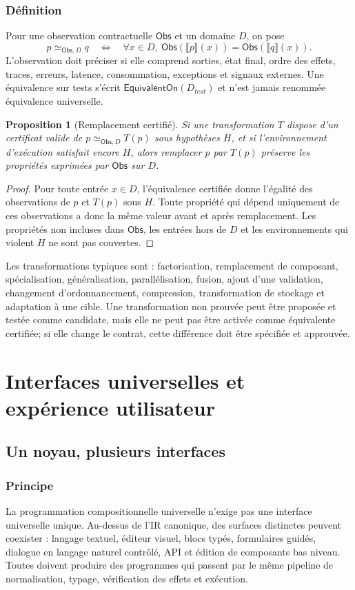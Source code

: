 \documentclass[11pt,a4paper,openany]{book}
\newcommand{\Obs}{\mathsf{Obs}}
\theoremstyle{definition}
\theoremstyle{plain}
\newtheorem{proposition}[definition]{Proposition}
\theoremstyle{remark}
\begin{document}
\section{Définition}
Pour une observation contractuelle $\Obs$ et un domaine $D$, on pose
\[
p\simeq_{\Obs,D}q\quad\Longleftrightarrow\quad \forall x\in D,\ \Obs(\llbracket p\rrbracket(x))=\Obs(\llbracket q\rrbracket(x)).
\]
L'observation doit préciser si elle comprend sorties, état final, ordre des effets, traces, erreurs, latence, consommation, exceptions et signaux externes. Une équivalence sur tests s'écrit $\mathsf{EquivalentOn}(D_{test})$ et n'est jamais renommée équivalence universelle.

\begin{proposition}[Remplacement certifié]
Si une transformation $T$ dispose d'un certificat valide de $p\simeq_{\Obs,D}T(p)$ sous hypothèses $H$, et si l'environnement d'exécution satisfait encore $H$, alors remplacer $p$ par $T(p)$ préserve les propriétés exprimées par $\Obs$ sur $D$.
\end{proposition}
\begin{proof}
Pour toute entrée $x\in D$, l'équivalence certifiée donne l'égalité des observations de $p$ et $T(p)$ sous $H$. Toute propriété qui dépend uniquement de ces observations a donc la même valeur avant et après remplacement. Les propriétés non incluses dans $\Obs$, les entrées hors de $D$ et les environnements qui violent $H$ ne sont pas couvertes.
\end{proof}

Les transformations typiques sont : factorisation, remplacement de composant, spécialisation, généralisation, parallélisation, fusion, ajout d'une validation, changement d'ordonnancement, compression, transformation de stockage et adaptation à une cible. Une transformation non prouvée peut être proposée et testée comme candidate, mais elle ne peut pas être activée comme équivalente certifiée; si elle change le contrat, cette différence doit être spécifiée et approuvée.

\part{Interfaces universelles et expérience utilisateur}
\chapter{Un noyau, plusieurs interfaces}
\section{Principe}
La programmation compositionnelle universelle n'exige pas une interface universelle unique. Au-dessus de l'IR canonique, des surfaces distinctes peuvent coexister : langage textuel, éditeur visuel, blocs typés, formulaires guidés, dialogue en langage naturel contrôlé, API et édition de composants bas niveau. Toutes doivent produire des programmes qui passent par le même pipeline de normalisation, typage, vérification des effets et exécution.
\end{document}
